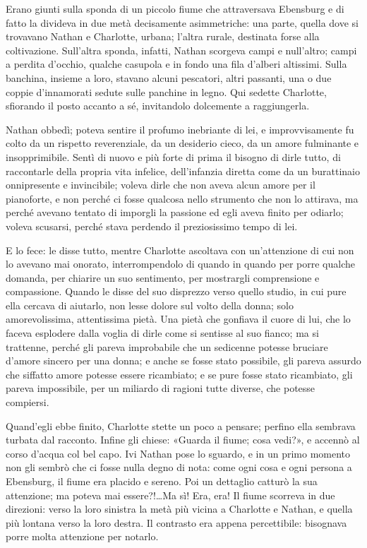 \documentclass[a4paper,oneside,11pt]{memoir}
\begin{document}
Erano giunti sulla sponda di un piccolo fiume che attraversava Ebensburg e di fatto la divideva in
due metà decisamente asimmetriche: una parte, quella dove si trovavano Nathan e Charlotte, urbana;
l'altra rurale, destinata forse alla coltivazione. Sull'altra sponda, infatti, Nathan scorgeva campi
e null'altro; campi a perdita d'occhio, qualche casupola e in fondo una fila d'alberi altissimi.
Sulla banchina, insieme a loro, stavano alcuni pescatori, altri passanti, una o due coppie
d'innamorati sedute sulle panchine in legno. Qui sedette Charlotte, sfiorando il posto accanto a sé,
invitandolo dolcemente a raggiungerla.

Nathan obbedì; poteva sentire il profumo inebriante di lei, e improvvisamente fu
colto da un rispetto reverenziale, da un desiderio cieco, da un amore fulminante
e insopprimibile. Sentì di nuovo e più forte di prima il bisogno di dirle tutto,
di raccontarle della propria vita infelice, dell'infanzia diretta come da un
burattinaio onnipresente e invincibile; voleva dirle che non aveva alcun amore
per il pianoforte, e non perché ci fosse qualcosa nello strumento che non lo
attirava, ma perché avevano tentato di imporgli la passione ed egli aveva finito
per odiarlo; voleva scusarsi, perché stava perdendo il preziosissimo tempo di
lei.

E lo fece: le disse tutto, mentre Charlotte ascoltava con un'attenzione di cui
non lo avevano mai onorato, interrompendolo di quando in quando per porre
qualche domanda, per chiarire un suo sentimento, per mostrargli comprensione e
compassione. Quando le disse del suo disprezzo verso quello studio, in cui pure
ella cercava di aiutarlo, non lesse dolore sul volto della donna; solo
amorevolissima, attentissima pietà. Una pietà che gonfiava il cuore di lui, che
lo faceva esplodere dalla voglia di dirle come si sentisse al suo fianco; ma si
trattenne, perché gli pareva improbabile che un sedicenne potesse bruciare
d'amore sincero per una donna; e anche se fosse stato possibile, gli pareva
assurdo che siffatto amore potesse essere ricambiato; e se pure fosse stato
ricambiato, gli pareva impossibile, per un miliardo di ragioni tutte diverse,
che potesse compiersi.

Quand'egli ebbe finito, Charlotte stette un poco a pensare; perfino ella
sembrava turbata dal racconto. Infine gli chiese: «Guarda il fiume; cosa vedi?»,
e accennò al corso d'acqua col bel capo. Ivi Nathan pose lo sguardo, e in un
primo momento non gli sembrò che ci fosse nulla degno di nota: come ogni cosa e
ogni persona a Ebensburg, il fiume era placido e sereno. Poi un dettaglio
catturò la sua attenzione; ma poteva mai essere?!\dots Ma sì! Era, era! Il fiume
scorreva in due direzioni: verso la loro sinistra la metà più vicina a Charlotte
e Nathan, e quella più lontana verso la loro destra. Il contrasto era appena
percettibile: bisognava porre molta attenzione per notarlo.
\end{document}
